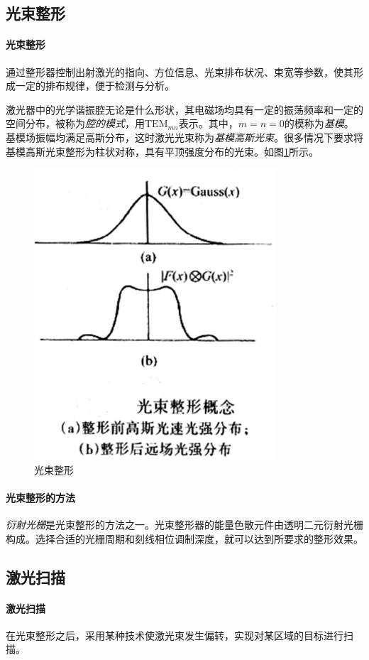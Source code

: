 \subsection{光束整形} %

\paragraph{光束整形}通过整形器控制出射激光的指向、方位信息、光束排布状况、束宽等参数，使其形成一定的排布规律，便于检测与分析。

激光器中的光学谐振腔无论是什么形状，其电磁场均具有一定的振荡频率和一定的空间分布，被称为\textit{腔的模式}，用$ \mathrm{TEM}_{mn} $表示。其中，$ m = n = 0 $的模称为\textit{基模}。基模场振幅均满足高斯分布，这时激光光束称为\textit{基模高斯光束}。很多情况下要求将基模高斯光束整形为柱状对称，具有平顶强度分布的光束。如图\ref{fig:光束整形}所示。
\begin{figure}[htbp]
	\centering
	\includegraphics[width=0.3\linewidth]{figure/Chapter2/光束整形}
	\caption{光束整形}
	\label{fig:光束整形}
\end{figure}

\paragraph{光束整形的方法}\textit{衍射光栅}是光束整形的方法之一。光束整形器的能量色散元件由透明二元衍射光栅构成。选择合适的光栅周期和刻线相位调制深度，就可以达到所要求的整形效果。

\subsection{激光扫描} %

\paragraph{激光扫描}在光束整形之后，采用某种技术使激光束发生偏转，实现对某区域的目标进行扫描。

